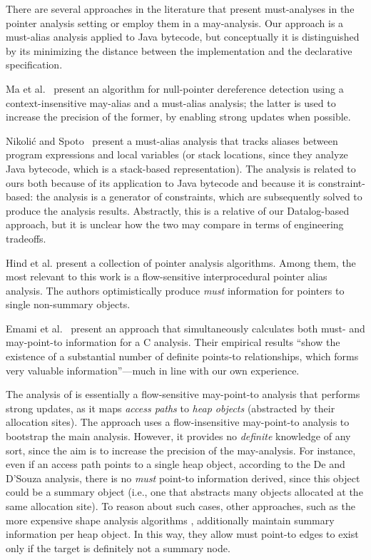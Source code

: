 There are several approaches in the literature that present must-analyses in the pointer analysis setting or employ them in a may-analysis. Our approach is a must-alias analysis applied to Java bytecode, but conceptually it is distinguished by its minimizing the distance between the implementation and the declarative specification.

Ma et al.~\cite{isola:2008:Ma} present an algorithm for null-pointer dereference detection using a context-insensitive may-alias and a must-alias analysis; the latter is used to increase the precision of the former, by enabling strong updates when possible.

Nikoli\'{c} and Spoto~\cite{ictac:2012:Nikolic} present a must-alias analysis that tracks aliases between program expressions and local variables (or stack locations, since they analyze Java bytecode, which is a stack-based representation). The analysis is related to ours both because of its application to Java bytecode and because it is constraint-based: the analysis is a generator of constraints, which are subsequently solved to produce the analysis results. Abstractly, this is a relative of our Datalog-based approach, but it is unclear how the two may compare in terms of engineering tradeoffs.

Hind et al. \cite{article:1999:Hind} present a collection of pointer analysis algorithms. Among them, the most relevant to this work is a flow-sensitive interprocedural pointer alias analysis. The authors optimistically produce \emph{must} information for pointers to single non-summary objects.

Emami et al.~\cite{pldi:1994:Emami} present an approach that simultaneously calculates both must- and may-point-to information for a C analysis. Their empirical results ``show the existence of a substantial number of definite points-to relationships, which forms very valuable information''---much in line with our own experience.

The analysis of \cite{ecoop:2012:De} is essentially a flow-sensitive may-point-to analysis that performs strong updates, as it maps \emph{access paths} to \emph{heap objects} (abstracted by their allocation sites). The approach uses a flow-insensitive may-point-to analysis to bootstrap the main analysis. However, it provides no \emph{definite} knowledge of any sort, since the aim is to increase the precision of the may-analysis. For instance, even if an access path points to a single heap object, according to the De and D'Souza analysis, there is no \emph{must} point-to information derived, since this object could be a summary object (i.e., one that abstracts many objects allocated at the same allocation site). To reason about such cases, other approaches, such as the more expensive shape analysis algorithms \cite{article:2002:Sagiv}, additionally maintain summary information per heap object. In this way, they allow must point-to edges to exist only if the target is definitely not a summary node.


